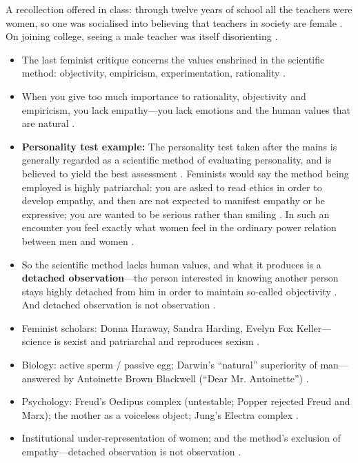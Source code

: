 \begin{ExampleBox}
A recollection offered in class: through twelve years of school all the teachers were women, so one was socialised into believing that teachers in society are female . On joining college, seeing a male teacher was itself disorienting .
\end{ExampleBox}

\begin{CriticalPoint}
\begin{itemize}
    \item The last feminist critique concerns the values enshrined in the scientific method: objectivity, empiricism, experimentation, rationality .
    \item When you give too much importance to rationality, objectivity and empiricism, you lack empathy---you lack emotions and the human values that are natural .
    \item \textbf{Personality test example:} The personality test taken after the mains is generally regarded as a scientific method of evaluating personality, and is believed to yield the best assessment . Feminists would say the method being employed is highly patriarchal: you are asked to read ethics in order to develop empathy, and then are not expected to manifest empathy or be expressive; you are wanted to be serious rather than smiling . In such an encounter you feel exactly what women feel in the ordinary power relation between men and women .
    \item So the scientific method lacks human values, and what it produces is a \textbf{detached observation}---the person interested in knowing another person stays highly detached from him in order to maintain so-called objectivity . And detached observation is not observation .
\end{itemize}
\end{CriticalPoint}

\begin{QuickRevision}
\begin{itemize}
    \item Feminist scholars: Donna Haraway, Sandra Harding, Evelyn Fox Keller---science is sexist and patriarchal and reproduces sexism .
    \item Biology: active sperm / passive egg; Darwin's ``natural'' superiority of man---answered by Antoinette Brown Blackwell (``Dear Mr. Antoinette'') .
    \item Psychology: Freud's Oedipus complex (untestable; Popper rejected Freud and Marx); the mother as a voiceless object; Jung's Electra complex .
    \item Institutional under-representation of women; and the method's exclusion of empathy---detached observation is not observation .
\end{itemize}
\end{QuickRevision}

